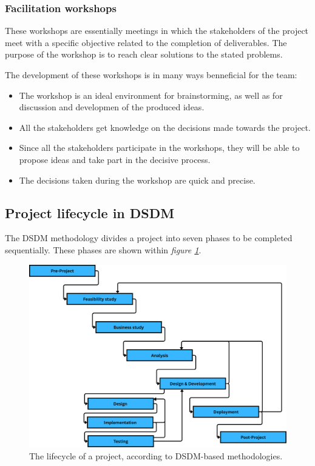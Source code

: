 \subsubsection{Facilitation workshops}\label{sec:facilitationWorkshops}

These workshops are essentially meetings in which the stakeholders of the project meet with a specific objective related to the completion of deliverables. The purpose of the 
workshop is to reach clear solutions to the stated problems.

The development of these workshops is in many ways benneficial for the team:

\begin{itemize}
    \item The workshop is an ideal environment for brainstorming, as well as for discussion and developmen of the produced ideas.
    \item All the stakeholders get knowledge on the decisions made towards the project.
    \item Since all the stakeholders participate in the workshops, they will be able to propose ideas and take part in the decisive process.
    \item The decisions taken during the workshop are quick and precise.
\end{itemize}

\subsection{Project lifecycle in \acrshort{DSDM}}\label{sec:DSDMLifecycle}

The \acrshort{DSDM} methodology divides a project into seven phases to be completed sequentially. These phases are shown within \emph{figure \ref{fig:DSDMLifecycle}}.

\begin{figure}[H]
    \centering
    \includegraphics[width=0.8\linewidth]{figs/dsdm-lifecycle.png}
    \caption{The lifecycle of a project, according to \acrshort{DSDM}-based methodologies.}
    \label{fig:DSDMLifecycle}
\end{figure}

